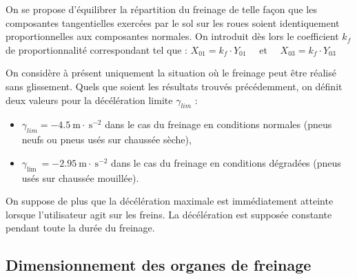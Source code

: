 On se propose d'équilibrer la répartition du freinage de telle façon que les composantes tangentielles exercées par le sol sur les roues soient identiquement proportionnelles aux composantes normales. On introduit dès lors le coefficient \(k_{f}\) de proportionnalité correspondant tel que :
$
X_{01}=k_{f} \cdot Y_{01} \quad \text { et } \quad X_{03}=k_{f} \cdot Y_{03}
$



On considère à présent uniquement la situation où le freinage peut être réalisé sans glissement. Quels que soient les résultats trouvés précédemment, on définit deux valeurs pour la décélération limite \(\gamma_{l i m}\) :

\begin{itemize}
  \item \(\gamma_{l i m}=-4.5 \mathrm{~m} \cdot \mathrm{~s}^{-2}\) dans le cas du freinage en conditions normales (pneus neufs ou pneus usés sur chaussée sèche),
  \item \(\gamma_{\text {lim }}=-2.95 \mathrm{~m} \cdot \mathrm{~s}^{-2}\) dans le cas du freinage en conditions dégradées (pneus usés sur chaussée mouillée).
\end{itemize}

On suppose de plus que la décélération maximale est immédiatement atteinte lorsque l'utilisateur agit sur les freins. La décélération est supposée constante pendant toute la durée du freinage.




\subsection{Dimensionnement des organes de freinage}

